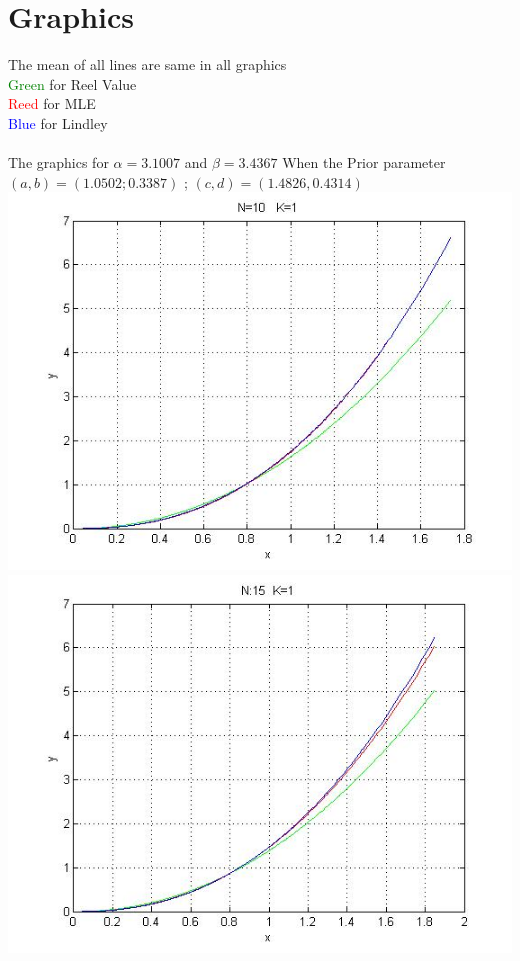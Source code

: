 \documentclass[a4paper, 11pt]{article}
\numberwithin{equation}{section}
\begin{document}
\section{Graphics}
The mean of all lines are same in all graphics\\
\textcolor{green}{Green} for Reel Value\\
\textcolor{red}{Reed} for  MLE\\
\textcolor{blue}{Blue} for Lindley\\\\
The graphics for $\alpha=3.1007$ and $\beta=3.4367$ When the Prior parameter $(a,b)= (1.0502;0.3387)$ ; $(c,d)=(1.4826,0.4314)$\\
\includegraphics[width=1.0\textwidth]{k1n10.jpg} 
\includegraphics[width=1.0\textwidth]{../k1n15.jpg}\\
\end{document}
